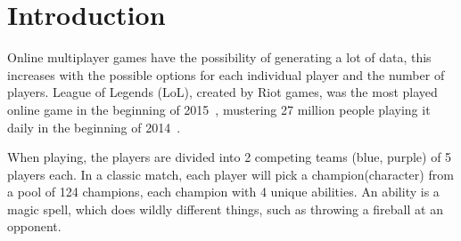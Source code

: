 \section{Introduction}\label{sec:intro}

Online multiplayer games have the possibility of generating a lot of data, this increases with the possible options for each individual player and the number of players. 
League of Legends (LoL), created by Riot games, was the most played online game in the beginning of 2015~\cite{LoLmostplayed}, mustering 27 million people playing it daily in the beginning of 2014~\cite{LoL27mill}. 

When playing, the players are divided into 2 competing teams (blue, purple) of 5 players each. In a classic match, each player will pick a champion(character) from a pool of 124 champions, each champion with 4 unique abilities. An ability is a magic spell, which does wildly different things, such as throwing a fireball at an opponent.
\\

